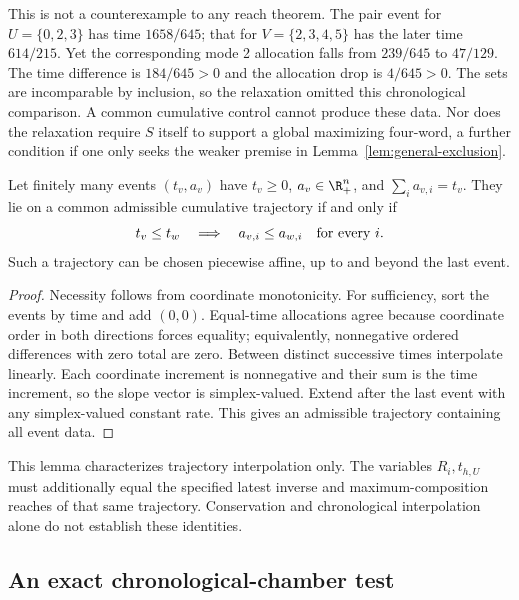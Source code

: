 This is not a counterexample to any reach theorem. The pair event for
$U=\{0,2,3\}$ has time $1658/645$; that for $V=\{2,3,4,5\}$ has
the later time $614/215$. Yet the corresponding mode 2 allocation falls
from $239/645$ to $47/129$. The time difference is $184/645>0$ and
the allocation drop is $4/645>0$. The sets are incomparable by inclusion,
so the relaxation omitted this chronological comparison. A common
cumulative control cannot produce these data. Nor does the relaxation
require $S$ itself to support a global maximizing four-word, a further
condition if one only seeks the weaker premise in
Lemma~\ref{lem:general-exclusion}.

\begin{lemma}\label{lem:event-interpolation}
Let finitely many events $(t_v,a_v)$ have $t_v\ge0$, $a_v\in\R_+^n$,
and $\sum_i a_{v,i}=t_v$. They lie on a common admissible cumulative
trajectory if and only if
\begin{equation}\label{eq:chronological-order}
 t_v\le t_w\quad\Longrightarrow\quad a_{v,i}\le a_{w,i}
                    \quad\hbox{for every }i.
\end{equation}
Such a trajectory can be chosen piecewise affine, up to and beyond the
last event.
\end{lemma}
\begin{proof}
Necessity follows from coordinate monotonicity. For sufficiency, sort the
events by time and add $(0,0)$. Equal-time allocations agree because
coordinate order in both directions forces equality; equivalently,
nonnegative ordered differences with zero total are zero. Between distinct
successive times interpolate linearly. Each coordinate increment is
nonnegative and their sum is the time increment, so the slope vector is
simplex-valued. Extend after the last event with any simplex-valued constant
rate. This gives an admissible trajectory containing all event data.
\end{proof}

This lemma characterizes trajectory interpolation only. The variables
$R_i,t_{h,U}$ must additionally equal the specified latest inverse and
maximum-composition reaches of that same trajectory. Conservation and
chronological interpolation alone do not establish these identities.

\subsection{An exact chronological-chamber test}\label{subsec:chronological-test}

